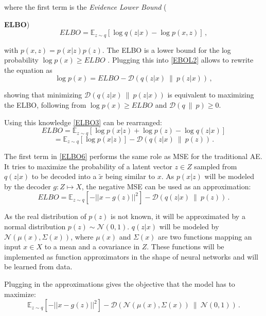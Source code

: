 \documentclass[a4paper]{IEEEtran}
\begin{document}
where the first term is the \textit{Evidence Lower Bound} ({\textbf{ELBO})
\begin{equation}
	ELBO = \mathbb{E}_{z \sim q} \left[ \log q(z|x) - \log p(x,z) \right]\,,
	\label{ELBO3}
\end{equation} 

with $p(x,z) = p(x|z)p(z)$. The ELBO is a lower bound for the log probability $\log p(x) \geq ELBO$ \cite{kingma_2019}. Plugging this into \eqref{EBOL2} allows to rewrite the equation as
\begin{equation}
	\log p(x) = ELBO - \mathcal{D}\left(q(z|x) \ \| \ p(z|x) \right)\,,
	\label{ELBO4}
\end{equation}

showing that minimizing $\mathcal{D}\left(q(z|x) \ \| \ p(z|x) \right)$ is equivalent to maximizing the ELBO, following from $\log p(x) \geq ELBO$ and $\mathcal{D}(q \ \| \ p) \geq 0$.

Using this knowledge \eqref{ELBO3} can be rearranged:
\begin{equation}
	ELBO = \mathbb{E}_{z \sim q}\left[ \log p(x|z) + \log p(z) - \log q(z|x) \right]
	\label{ELBO5}
\end{equation}
\begin{equation}
	= \mathbb{E}_{z \sim q}\left[ \log p(x|z) \right] - \mathcal{D}(q(z|x) \ \| \ p(z))\,.
	\label{ELBO6}
\end{equation}

The first term in \eqref{ELBO6} performs the same role as MSE for the traditional AE. It tries to maximize the probability of a latent vector $z \in Z$ sampled from $q(z|x)$ to be decoded into a $\tilde{x}$ being similar to $x$. As $p(x|z)$ will be modeled by the decoder $g : Z \mapsto X$, the negative MSE can be used as an approximation:
\begin{equation}
	ELBO = \mathbb{E}_{z \sim q}\left[ -||x - g(z)||^2 \right] - \mathcal{D}(q(z|x) \ \| \ p(z))\,.
	\label{ELBO7}
\end{equation}

As the real distribution of $p(z)$ is not known, it will be approximated by a normal distribution $p(z) \sim \mathcal{N}(0,1)$. $q(z|x)$ will be modeled by $\mathcal{N}(\mu(x), \Sigma(x))$, where $\mu(x)$ and $\Sigma(x)$ are two functions mapping an input $x \in X$ to a mean and a covariance in $Z$. These functions will be implemented as function approximators in the shape of neural networks and will be learned from data.

Plugging in the approximations gives the objective that the model has to maximize:
\begin{equation}
	\mathbb{E}_{z \sim q}\left[ -||x - g(z)||^2 \right] - \mathcal{D}(\mathcal{N}(\mu(x), \Sigma(x)) \ \| \ \mathcal{N}(0, 1))\,.
	\label{ELBO8}
\end{equation}

}
\end{document}
